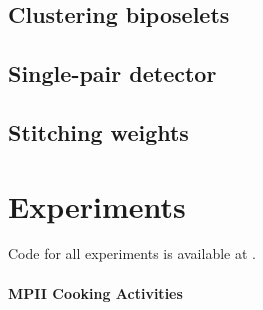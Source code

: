 \documentclass[runningheads]{llncs}
\begin{document}
\subsection{Clustering biposelets}


\subsection{Single-pair detector}

\cite{ramanan2013dual}

\subsection{Stitching weights}


\section{Experiments}


Code for all experiments is available at .

\paragraph{MPII Cooking Activities}


\end{document}
